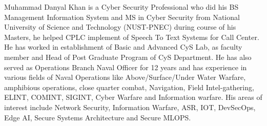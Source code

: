 \documentclass[lettersize,journal]{IEEEtran}
\begin{document}
\begin{IEEEbiography}{Muhammad Danyal Khan} is a Cyber Security Professional who did his BS Management Information System and MS in Cyber Security from National University of Science and Technology (NUST-PNEC) during course of his Masters, he helped CPLC implement of Speech To Text Systems for Call Center. He has worked in establishment of Basic and Advanced CyS Lab, as faculty member and Head of Post Graduate Program of CyS Department. He has also served as Operations Branch Naval Officer for 12 years and has experience in various fields of Naval Operations like Above/Surface/Under Water Warfare, amphibious operations, close quarter combat, Navigation, Field Intel-gathering, ELINT, COMINT, SIGINT, Cyber Warfare and Information warfare. His areas of interest include Network Security, Information Warfare, ASR, IOT, DevSecOps, Edge AI, Secure Systems Architecture and Secure MLOPS.
\end{IEEEbiography}

\end{document}
